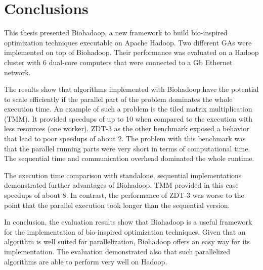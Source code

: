 \chapter{Conclusions}
\label{chap:conclusions}
This thesis presented Biohadoop, a new framework to build bio-inspired optimization techniques executable on Apache Hadoop. Two different GAs were implemented on top of Biohadoop. Their performance was evaluated on a Hadoop cluster with 6 dual-core computers that were connected to a \unit[1]{Gb} Ethernet network.

The results show that algorithms implemented with Biohadoop have the potential to scale efficiently if the parallel part of the problem dominates the whole execution time. An example of such a problem is the tiled matrix multiplication (TMM). It provided speedups of up to 10 when compared to the execution with less resources (one worker). ZDT-3 as the other benchmark exposed a behavior that lead to poor speedups of about 2. The problem with this benchmark was that the parallel running parts were very short in terms of computational time. The sequential time and communication overhead dominated the whole runtime.

The execution time comparison with standalone, sequential implementations demonstrated further advantages of Biohadoop. TMM provided in this case speedups of about 8. In contrast, the performance of ZDT-3 was worse to the point that the parallel execution took longer than the sequential version.


In conclusion, the evaluation results show that Biohadoop is a useful framework for the implementation of bio-inspired optimization techniques. Given that an algorithm is well suited for parallelization, Biohadoop offers an easy way for its implementation. The evaluation demonstrated also that such parallelized algorithms are able to perform very well on Hadoop.